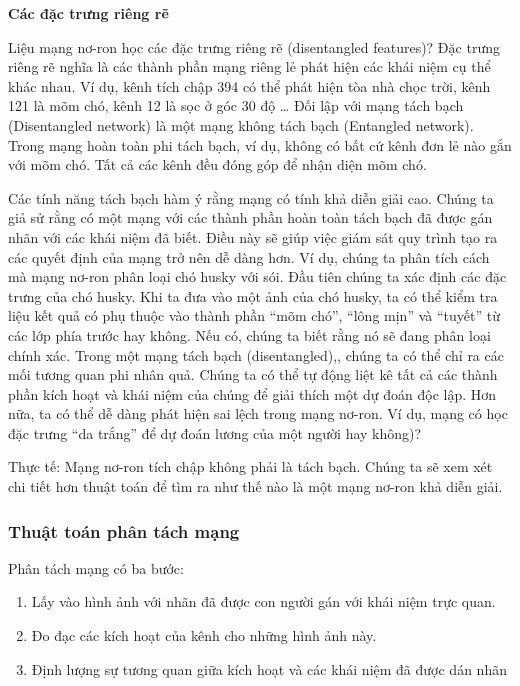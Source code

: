 \textbf{Các đặc trưng riêng rẽ}

Liệu mạng nơ-ron học các đặc trưng riêng rẽ (disentangled features)? Đặc trưng riêng rẽ nghĩa là các thành phần mạng riêng lẻ phát hiện các khái niệm cụ thể khác nhau. Ví dụ, kênh tích chập 394 có thể phát hiện tòa nhà chọc trời, kênh 121 là mõm chó, kênh 12 là sọc ở góc 30 độ … Đối lập với mạng tách bạch (Disentangled network) là một mạng không tách bạch (Entangled network). Trong mạng hoàn toàn phi tách bạch, ví dụ, không có bất cứ kênh đơn lẻ nào gắn với mõm chó. Tất cả các kênh đều đóng góp để nhận diện mõm chó.

Các tính năng tách bạch hàm ý rằng mạng có tính khả diễn giải cao. Chúng ta giả sử rằng có một mạng với các thành phần hoàn toàn tách bạch đã được gán nhãn với các khái niệm đã biết. Điều này sẽ giúp việc giám sát quy trình tạo ra các quyết định của mạng trở nên dễ dàng hơn. Ví dụ, chúng ta phân tích cách mà mạng nơ-ron phân loại chó husky với sói. Đầu tiên chúng ta xác định các đặc trưng của chó husky. Khi ta đưa vào một ảnh của chó husky, ta có thể kiểm tra liệu kết quả có phụ thuộc vào thành phần ``mõm chó'', ``lông mịn'' và ``tuyết'' từ các lớp phía trước hay không. Nếu có, chúng ta biết rằng nó sẽ đang phân loại chính xác. Trong một mạng tách bạch (disentangled),, chúng ta có thể chỉ ra các mối tương quan phi nhân quả. Chúng ta có thể tự động liệt kê tất cả các thành phần kích hoạt và khái niệm của chúng để giải thích một dự đoán độc lập. Hơn nữa, ta có thể dễ dàng phát hiện sai lệch trong mạng nơ-ron. Ví dụ, mạng có học đặc trưng “da trắng” để dự đoán lương của một người hay không)?

Thực tế: Mạng nơ-ron tích chập không phải là tách bạch. Chúng ta sẽ xem xét chi tiết hơn thuật toán để tìm ra như thế nào là một mạng nơ-ron khả diễn giải.

\subsubsection{Thuật toán phân tách mạng}

Phân tách mạng có ba bước:

\begin{enumerate}
  \item Lấy vào hình ảnh với nhãn đã được con người gán với khái niệm trực quan.
  \item Đo đạc các kích hoạt của kênh cho những hình ảnh này.
  \item Định lượng sự tương quan giữa kích hoạt và các khái niệm đã được dán nhãn
\end{enumerate}

